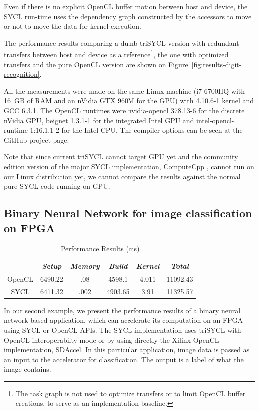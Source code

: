 \documentclass[sigplan]{acmart}
\begin{document}
Even if there is no explicit OpenCL buffer motion between host and
device, the SYCL run-time uses the dependency graph constructed by the
accessors to move or not to move the data for kernel execution.

The performance results comparing a dumb triSYCL version with
redundant transfers between host and device as a
reference\footnote{The task graph is not used to optimize transfers or
  to limit OpenCL buffer creations, to serve as an implementation
  baseline.}, the one with optimized transfers and the pure OpenCL
version are shown on Figure~\ref{fig:results-digit-recognition}.

All the measurements were made on the same Linux machine (i7-6700HQ
with 16~GB of RAM and an nVidia GTX 960M for the GPU) with 4.10.6-1 kernel
and GCC 6.3.1. The OpenCL runtimes were nvidia-opencl
378.13-6 for the discrete nVidia GPU, beignet 1.3.1-1 for the
integrated Intel GPU and intel-opencl-runtime 1:16.1.1-2 for the Intel
CPU. The compiler options can be seen at the GitHub project page.

Note that since current triSYCL \cite{triSYCL} cannot target GPU yet
and the community edition version of the major SYCL implementation,
ComputeCpp \cite{ComputeCpp}, cannot run on our Linux distribution yet,
we cannot compare the results against the normal pure SYCL code
running on GPU.


\subsection{Binary Neural Network for image classification on FPGA}
\label{sec:example-from-ken}

\begin{table}
  \caption{Performance Results (ms)}
  \begin{tabular}{|c |c| c| c| c| c |}
    \hline
    &   \textit{Setup}      & \textit{Memory} & \textit{Build}  & \textit{Kernel} & \textit{Total} \\\hline
    OpenCL& 6490.22     &     .08& 4598.1   & 4.011 &11092.43 \\\hline
    SYCL  & 6411.32     & .002 & 4903.65  & 3.91  &11325.57 \\\hline
  \end{tabular}
  \label{tbl:perfbnn}
\end{table}


In our second example, we present the performance results of a binary
neural network based application, which can accelerate its computation
on an FPGA using SYCL or OpenCL APIs. The SYCL implementation uses
triSYCL with OpenCL interoperabilty mode or by using directly the Xilinx OpenCL implementation, SDAccel. In this particular application, image data is passed as an input to the accelerator for classification. The output is a label of what the image contains.
\end{document}

